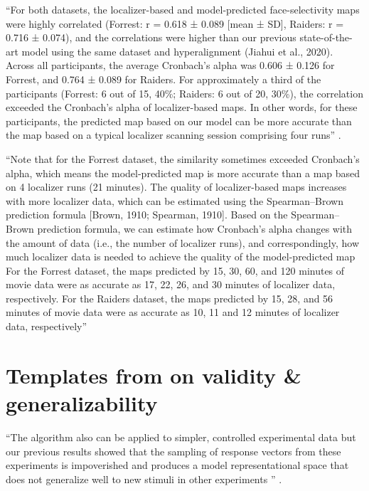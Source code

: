 %
``For both datasets, the localizer-based and model-predicted face-selectivity
maps were highly correlated (Forrest: r = 0.618 ± 0.089 [mean ± SD], Raiders: r
= 0.716 ± 0.074), and the correlations were higher than our previous
state-of-the-art model using the same dataset and hyperalignment (Jiahui et al.,
2020).
%
Across all participants, the average Cronbach's alpha was 0.606 ± 0.126 for
Forrest, and 0.764 ± 0.089 for Raiders.
%
For approximately a third of the participants (Forrest: 6 out of 15, 40\%;
Raiders: 6 out of 20, 30\%), the correlation exceeded the Cronbach's alpha of
localizer-based maps.
%
In other words, for these participants, the predicted map based on our model can
be more accurate than the map based on a typical localizer scanning session
comprising four runs'' \citep{feilong2022individualized}.

%
``Note that for the Forrest dataset, the similarity sometimes exceeded
Cronbach's alpha, which means the model-predicted map is more accurate than a
map based on 4 localizer runs (21 minutes).
%
The quality of localizer-based maps increases with more localizer data, which
can be estimated using the Spearman–Brown prediction formula [Brown, 1910;
Spearman, 1910].
%
Based on the Spearman–Brown prediction formula, we can estimate how Cronbach's
alpha changes with the amount of data (i.e., the number of localizer runs), and
correspondingly, how much localizer data is needed to achieve the quality of the
model-predicted map
%
For the Forrest dataset, the maps predicted by 15, 30, 60, and 120 minutes of
movie data were as accurate as 17, 22, 26, and 30 minutes of localizer data,
respectively.
%
For the Raiders dataset, the maps predicted by 15, 28, and 56 minutes of movie
data were as accurate as 10, 11 and 12 minutes of localizer data, respectively''
\citep{feilong2022individualized}


\pagebreak

\section{Templates from \citet{haxby2011common} on validity \& generalizability}

%
``The algorithm also can be applied to simpler, controlled experimental data but
our previous results showed that the sampling of response vectors from these
experiments is impoverished and produces a model representational space that
does not generalize well to new stimuli in other experiments
\citep{haxby2020hyperalignment}'' \citep{guntupalli2016model}.


